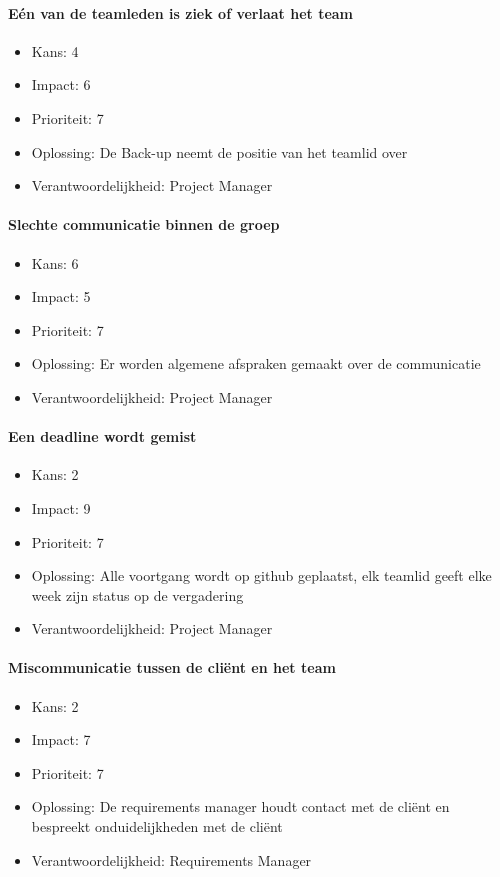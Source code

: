 \paragraph{Eén van de teamleden is ziek of verlaat het team}
\begin{itemize}
\item Kans: 4
\item Impact: 6
\item Prioriteit: 7
\item Oplossing: De Back-up neemt de positie van het teamlid over
\item Verantwoordelijkheid: Project Manager
\end{itemize}

\paragraph{Slechte communicatie binnen de groep}
\begin{itemize}
\item Kans: 6
\item Impact: 5
\item Prioriteit: 7
\item Oplossing: Er worden algemene afspraken gemaakt over de communicatie
\item Verantwoordelijkheid: Project Manager
\end{itemize}

\paragraph{Een deadline wordt gemist}
\begin{itemize}
\item Kans: 2
\item Impact: 9
\item Prioriteit: 7
\item Oplossing: Alle voortgang wordt op github geplaatst, elk teamlid geeft elke week zijn status op de vergadering
\item Verantwoordelijkheid: Project Manager
\end{itemize}

\paragraph{Miscommunicatie tussen de cliënt en het team}
\begin{itemize}
\item Kans: 2
\item Impact: 7
\item Prioriteit: 7
\item Oplossing: De requirements manager houdt contact met de cliënt en bespreekt onduidelijkheden met de cliënt
\item Verantwoordelijkheid: Requirements Manager
\end{itemize}

